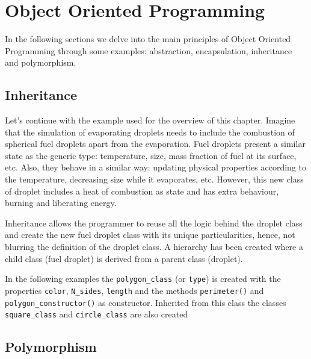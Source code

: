 \chapter{Object Oriented Programming} 


In the following sections we delve into the main principles of Object Oriented Programming through some examples: 
abstraction, encapsulation, inheritance and polymorphism. 


    \section{Inheritance}

Let's continue with the example used for the overview of this chapter. 
Imagine that the simulation of evaporating droplets needs to include the combustion of spherical fuel droplets apart from the evaporation.
Fuel droplets present a similar state as the generic type: temperature, size, mass fraction of fuel at its surface, etc.
Also, they behave in a similar way: updating physical properties according to the temperature, decreasing size while it evaporates, etc. 
However, this new class of droplet includes a heat of combustion as state and has extra behaviour, burning and liberating energy. 

Inheritance allows the programmer to reuse all the logic behind the droplet class 
and create the new fuel droplet class with its unique particularities, hence, not blurring the 
definition of the droplet class.
A hierarchy has been created where a child class (fuel droplet) is derived from a parent class (droplet).

In the following examples the \texttt{polygon\_class} (or \texttt{type}) is created with 
the properties \texttt{color}, \texttt{N\_sides}, \texttt{length} and 
the methods \texttt{perimeter()} and \texttt{polygon\_constructor()} as constructor. 
Inherited from this class the classes \texttt{square\_class} and \texttt{circle\_class} are also created  






    \section{Polymorphism} 

